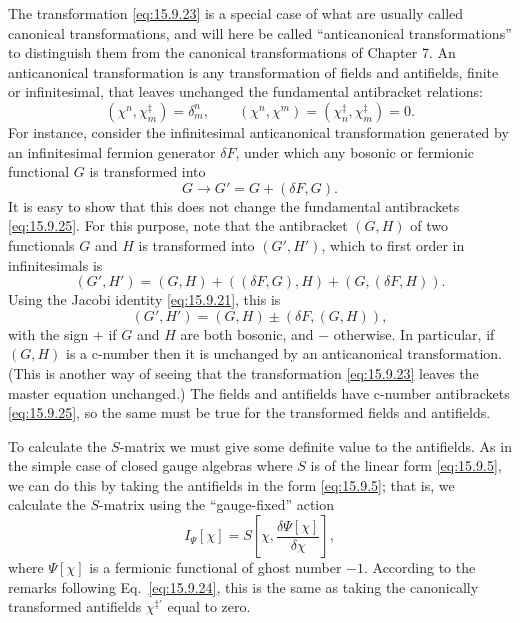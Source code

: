 The transformation \eqref{eq:15.9.23} is a special case of what are usually
called canonical transformations, and will here be called ``anticanonical
transformations'' to distinguish them from the canonical transformations of
Chapter 7. An anticanonical transformation is any transformation of fields and
antifields, finite or infinitesimal, that leaves unchanged the fundamental
antibracket relations:
\begin{equation}
(\chi^n,\chi_m^{\ddagger})=\delta^n_m,
\qquad
(\chi^n,\chi^m)=(\chi_n^{\ddagger},\chi_m^{\ddagger})=0.
\tag{15.9.25}\label{eq:15.9.25}
\end{equation}
For instance, consider the infinitesimal anticanonical transformation
generated by an infinitesimal fermion generator $\delta F$, under which any
bosonic or fermionic functional $G$ is transformed into
\begin{equation}
G\longrightarrow G'=G+(\delta F,G).
\tag{15.9.26}\label{eq:15.9.26}
\end{equation}
It is easy to show that this does not change the fundamental antibrackets
\eqref{eq:15.9.25}. For this purpose, note that the antibracket $(G,H)$ of two
functionals $G$ and $H$ is transformed into $(G',H')$, which to first order in
infinitesimals is
\[
(G',H')=(G,H)+((\delta F,G),H)+(G,(\delta F,H)).
\]
Using the Jacobi identity \eqref{eq:15.9.21}, this is
\begin{equation}
(G',H')=(G,H)\pm(\delta F,(G,H)),
\tag{15.9.27}\label{eq:15.9.27}
\end{equation}
with the sign $+$ if $G$ and $H$ are both bosonic, and $-$ otherwise. In
particular, if $(G,H)$ is a c-number then it is unchanged by an anticanonical
transformation. (This is another way of seeing that the transformation
\eqref{eq:15.9.23} leaves the master equation unchanged.) The fields and
antifields have c-number antibrackets \eqref{eq:15.9.25}, so the same must be
true for the transformed fields and antifields.

To calculate the $S$-matrix we must give some definite value to the
antifields. As in the simple case of closed gauge algebras where $S$ is of the
linear form \eqref{eq:15.9.5}, we can do this by taking the antifields in the
form \eqref{eq:15.9.5}; that is, we calculate the $S$-matrix using the
``gauge-fixed'' action
\begin{equation}
I_\Psi[\chi]=S\left[\chi,\frac{\delta\Psi[\chi]}{\delta\chi}\right],
\tag{15.9.28}\label{eq:15.9.28}
\end{equation}
where $\Psi[\chi]$ is a fermionic functional of ghost number $-1$. According
to the remarks following Eq.~\eqref{eq:15.9.24}, this is the same as taking
the canonically transformed antifields $\chi^{\ddagger\prime}$ equal to zero.


